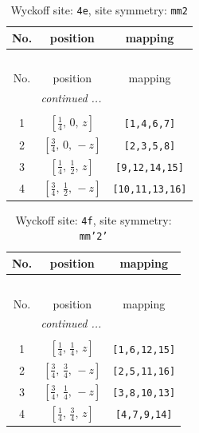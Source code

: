 \documentclass[fleqn,8pt]{jsarticle}
\begin{document}
\renewcommand{\arraystretch}{1.2}
\begin{longtable}{ccc}
\caption{Wyckoff site: {\tt 4e}, site symmetry: {\tt mm2}}
 \\
 \hline \hline
No. & position & mapping \\ \hline \endfirsthead

\multicolumn{2}{l}{\tablename\ \thetable{}} \\
 \hline \hline
No. & position & mapping \\ \hline \endhead

 \hline \hline
\multicolumn{2}{r}{\footnotesize\it continued ...} \\ \endfoot

 \hline \hline
\multicolumn{2}{r}{} \\ \endlastfoot

1 & $\left[ \frac{1}{4},\, 0,\, z \right]$ & {\tt [1,4,6,7]} \\ \hline
2 & $\left[ \frac{3}{4},\, 0,\, - z \right]$ & {\tt [2,3,5,8]} \\ \hline
3 & $\left[ \frac{1}{4},\, \frac{1}{2},\, z \right]$ & {\tt [9,12,14,15]} \\ \hline
4 & $\left[ \frac{3}{4},\, \frac{1}{2},\, - z \right]$ & {\tt [10,11,13,16]} \\
\end{longtable}
\renewcommand{\arraystretch}{1.2}
\begin{longtable}{ccc}
\caption{Wyckoff site: {\tt 4f}, site symmetry: {\tt mm'2'}}
 \\
 \hline \hline
No. & position & mapping \\ \hline \endfirsthead

\multicolumn{2}{l}{\tablename\ \thetable{}} \\
 \hline \hline
No. & position & mapping \\ \hline \endhead

 \hline \hline
\multicolumn{2}{r}{\footnotesize\it continued ...} \\ \endfoot

 \hline \hline
\multicolumn{2}{r}{} \\ \endlastfoot

1 & $\left[ \frac{1}{4},\, \frac{1}{4},\, z \right]$ & {\tt [1,6,12,15]} \\ \hline
2 & $\left[ \frac{3}{4},\, \frac{3}{4},\, - z \right]$ & {\tt [2,5,11,16]} \\ \hline
3 & $\left[ \frac{3}{4},\, \frac{1}{4},\, - z \right]$ & {\tt [3,8,10,13]} \\ \hline
4 & $\left[ \frac{1}{4},\, \frac{3}{4},\, z \right]$ & {\tt [4,7,9,14]} \\
\end{longtable}
\end{document}
